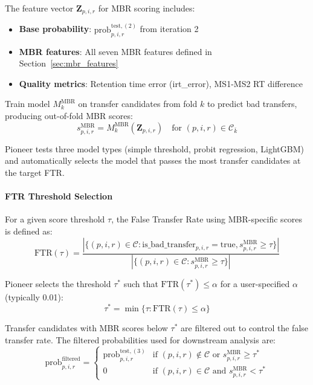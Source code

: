 \documentclass[pdflatex,sn-nature]{sn-jnl}
\begin{document}
The feature vector $\mathbf{Z}_{p,i,r}$ for MBR scoring includes:
\begin{itemize}
  \item \textbf{Base probability}: $\text{prob}_{p,i,r}^{\text{test},(2)}$ from iteration 2
  \item \textbf{MBR features}: All seven MBR features defined in Section~\ref{sec:mbr_features}
  \item \textbf{Quality metrics}: Retention time error (irt\_error), MS1-MS2 RT difference
\end{itemize}

Train model $M_k^{\text{MBR}}$ on transfer candidates from fold $k$ to predict bad transfers, producing out-of-fold MBR scores:
\begin{equation}
  s_{p,i,r}^{\text{MBR}} = M_k^{\text{MBR}}(\mathbf{Z}_{p,i,r}) \quad \text{for } (p,i,r) \in \mathcal{C}_{\bar{k}}
\end{equation}

Pioneer tests three model types (simple threshold, probit regression, LightGBM) and automatically selects the model that passes the most transfer candidates at the target FTR.

\paragraph{FTR Threshold Selection}\label{para:ftr-threshold-selection} For a given score threshold $\tau$, the False Transfer Rate using MBR-specific scores is defined as:
\begin{equation}
  \text{FTR}(\tau) = \frac{|\{(p,i,r) \in \mathcal{C} : \text{is\_bad\_transfer}_{p,i,r} = \text{true}, s_{p,i,r}^{\text{MBR}} \geq \tau\}|}{|\{(p,i,r) \in \mathcal{C} : s_{p,i,r}^{\text{MBR}} \geq \tau\}|}
\end{equation}

Pioneer selects the threshold $\tau^*$ such that $\text{FTR}(\tau^*) \leq \alpha$ for a user-specified $\alpha$ (typically 0.01):
\begin{equation}
  \tau^* = \min\{\tau : \text{FTR}(\tau) \leq \alpha\}
\end{equation}

Transfer candidates with MBR scores below $\tau^*$ are filtered out to control the false transfer rate. The filtered probabilities used for downstream analysis are:
\begin{equation}
  \text{prob}_{p,i,r}^{\text{filtered}} = \begin{cases}
      \text{prob}_{p,i,r}^{\text{test},(3)} & \text{if } (p,i,r) \notin \mathcal{C} \text{ or } s_{p,i,r}^{\text{MBR}} \geq \tau^* \\
      0 & \text{if } (p,i,r) \in \mathcal{C} \text{ and } s_{p,i,r}^{\text{MBR}} < \tau^*
    \end{cases}
\end{equation}
\end{document}
